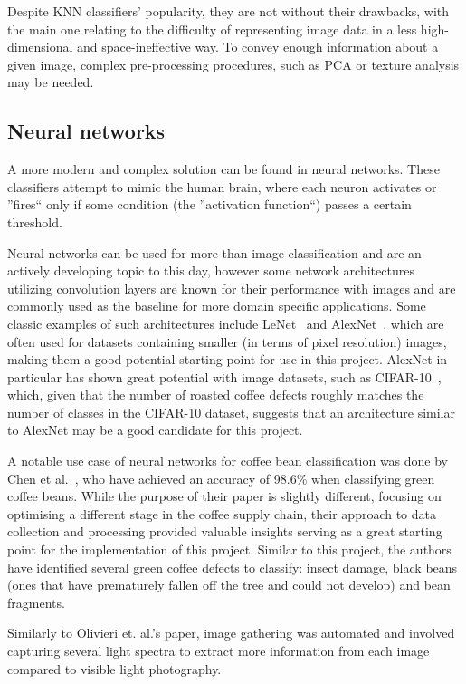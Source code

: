 Despite KNN classifiers' popularity, they are not without their drawbacks, with the main one relating to
the difficulty of representing image data in a less high-dimensional and space-ineffective way.
To convey enough information about a given image, complex pre-processing procedures, such as PCA or texture analysis may
be needed.

\subsection{Neural networks}
A more modern and complex solution can be found in neural networks.
These classifiers
attempt to mimic the human brain, where each neuron activates or ''fires`` only
if some condition (the ''activation function``) passes a certain threshold.

Neural networks can be used for more than image classification and are an
actively developing topic to this day, however some network architectures utilizing convolution layers are known
for their performance with images and are commonly used as the baseline for more
domain specific applications.
Some classic examples of such architectures include LeNet~\cite{leNetOverview}
and AlexNet~\cite{alexNetOverview}, which are often used for datasets containing
smaller (in terms of pixel resolution) images, making them a good potential
starting point for use in this project.
AlexNet in particular has shown great potential
with image datasets, such as CIFAR-10~\cite{cifar10}, which, given that the
number of roasted coffee defects roughly matches the number of classes in the
CIFAR-10 dataset, suggests that an architecture similar to AlexNet may be a good
candidate for this project.

A notable use case of neural networks for coffee bean classification was done by Chen et al.~\cite{hyperspectralChen},
who have achieved an accuracy of 98.6\% when
classifying green coffee beans.
While the purpose of their paper is slightly different,
focusing on optimising a different stage in the coffee supply chain, their approach
to data collection and processing provided valuable insights serving as a great starting
point for the implementation of this project.
Similar to this project, the authors have identified several green coffee
defects to classify: insect damage, black beans (ones that have prematurely
fallen off the tree and could not develop) and bean fragments.

Similarly to Olivieri et. al.'s paper, image gathering was automated and involved capturing
several light spectra to extract more information from each image compared to visible light photography.

